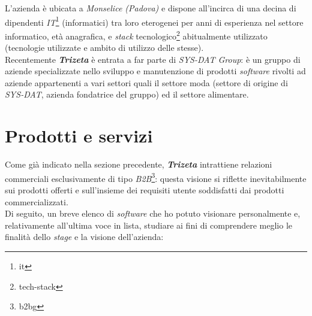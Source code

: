 L'azienda è ubicata a \textit{Monselice (Padova)} e dispone all'incirca di una decina di dipendenti \textit{IT}\footnote{\gls{it}} (informatici) tra loro eterogenei per anni di esperienza nel settore informatico, età anagrafica, e 
\textit{stack} tecnologico\footnote{\gls{tech-stack}} abitualmente utilizzato (tecnologie utilizzate e ambito di utilizzo delle stesse). \\
Recentemente \textit{\textbf{Trizeta}} è entrata a far parte di \textit{SYS-DAT Group}: è un gruppo di aziende specializzate nello sviluppo e manutenzione di prodotti \textit{software} rivolti ad aziende appartenenti a vari settori quali 
il settore moda (settore di origine di \textit{SYS-DAT}, azienda fondatrice del gruppo) ed il settore alimentare. 


\section{Prodotti e servizi}

Come già indicato nella sezione precedente, \textit{\textbf{Trizeta}} intrattiene relazioni commerciali esclusivamente di tipo \textit{B2B}\footnote{\gls{b2bg}}: questa visione si riflette inevitabilmente sui prodotti offerti
e sull'insieme dei requisiti utente soddisfatti dai prodotti commercializzati. \\
Di seguito, un breve elenco di \textit{software} che ho potuto visionare personalmente e, relativamente all'ultima voce in lista, studiare ai fini di comprendere meglio le finalità dello \textit{stage} e la visione dell'azienda:

